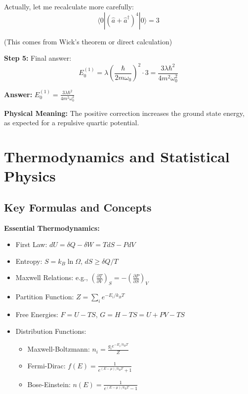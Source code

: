 \documentclass[12pt,a4paper]{article}
\begin{document}
\begin{solution}
Actually, let me recalculate more carefully:
$$\langle 0|(\hat{a} + \hat{a}^\dagger)^4|0\rangle = 3$$

(This comes from Wick's theorem or direct calculation)

\textbf{Step 5:} Final answer:
$$E_0^{(1)} = \lambda\left(\frac{\hbar}{2m\omega_0}\right)^2 \cdot 3 = \frac{3\lambda\hbar^2}{4m^2\omega_0^2}$$

\textbf{Answer:} $E_0^{(1)} = \frac{3\lambda\hbar^2}{4m^2\omega_0^2}$

\textbf{Physical Meaning:} The positive correction increases the ground state energy, as expected for a repulsive quartic potential.
\end{solution}

\newpage


\section{Thermodynamics and Statistical Physics}

\subsection{Key Formulas and Concepts}

\begin{theorem}
\textbf{Essential Thermodynamics:}
\begin{itemize}
    \item First Law: $dU = \delta Q - \delta W = TdS - PdV$
    \item Entropy: $S = k_B\ln\Omega$, $dS \geq \delta Q/T$
    \item Maxwell Relations: e.g., $\left(\frac{\partial T}{\partial V}\right)_S = -\left(\frac{\partial P}{\partial S}\right)_V$
    \item Partition Function: $Z = \sum_i e^{-E_i/k_BT}$
    \item Free Energies: $F = U - TS$, $G = H - TS = U + PV - TS$
    \item Distribution Functions:
        \begin{itemize}
            \item Maxwell-Boltzmann: $n_i = \frac{g_i e^{-E_i/k_BT}}{Z}$
            \item Fermi-Dirac: $f(E) = \frac{1}{e^{(E-\mu)/k_BT} + 1}$
            \item Bose-Einstein: $n(E) = \frac{1}{e^{(E-\mu)/k_BT} - 1}$
        \end{itemize}
\end{itemize}
\end{theorem}
\end{document}
